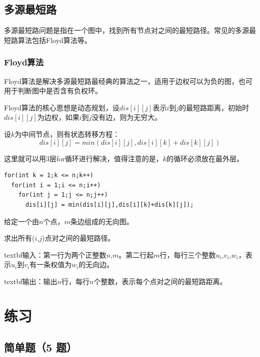 \documentclass{article}
\begin{document}
\subsection{多源最短路}

多源最短路问题是指在一个图中，找到所有节点对之间的最短路径。常见的多源最短路算法包括Floyd算法等。

\subsubsection{Floyd算法}

Floyd算法是解决多源最短路最经典的算法之一，适用于边权可以为负的图，也可用于判断图中是否含有负权环。

Floyd算法的核心思想是动态规划，设$dis[i][j]$表示$i$到$j$的最短路距离，初始时$dis[i][j]$为边权，如果$i$到$j$没有边，则为无穷大。

设$k$为中间节点，则有状态转移方程：
$$dis[i][j] = min(dis[i][j],dis[i][k]+dis[k][j])$$

这里就可以用3层for循环进行解决，值得注意的是，$k$的循环必须放在最外层。

    \begin{lstlisting}
for(int k = 1;k <= n;k++)
  for(int i = 1;i <= n;i++)
    for(int j = 1;j <= n;j++)
      dis[i][j] = min(dis[i][j],dis[i][k]+dis[k][j]);
    \end{lstlisting}

\begin{problem}

  给定一个由$n$个点，$m$条边组成的无向图。

  求出所有($i$,$j$)点对之间的最短路径。

  textbf{输入}：第一行为两个正整数$n$,$m$。第二行起$m$行，每行三个整数$u_i$,$v_i$,$w_i$，表示$u_i$到$v_i$有一条权值为$w_i$的无向边。

  textbf{输出}：输出$n$行，每行$n$个整数，表示每个点对之间的最短路距离。
\end{problem}



\section{练习}

\subsection{简单题（5 题）}
\end{document}
